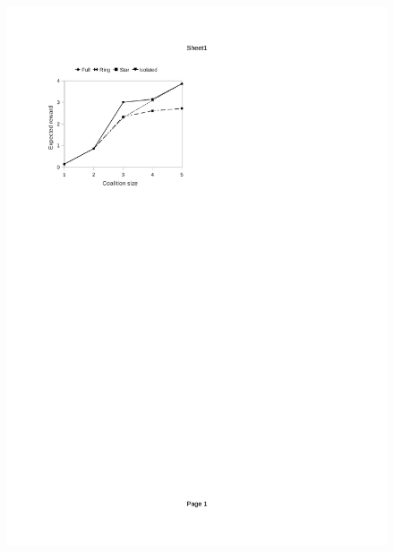 \documentclass{llncs}
\begin{document}
\begin{figure}[H]
{\includegraphics[clip=true, trim=57 550 280 90, scale=0.77]{images/w1_stpg_online}
}


\end{figure}
\end{document}
